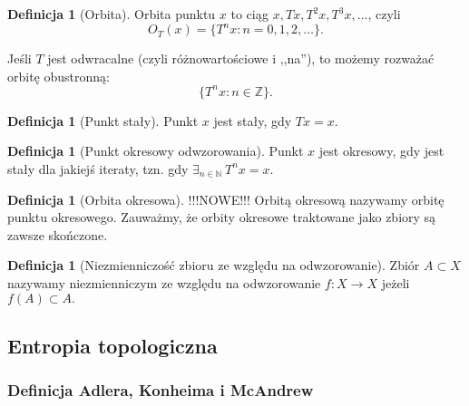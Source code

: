 \documentclass[licencjacka]{pwr_wmat_praca_dyplomowa}
\theoremstyle{plain}
\numberwithin{theorem}{chapter}
\theoremstyle{definition}
\numberwithin{theorem}{chapter}
\newtheorem{definition}[theorem]{Definicja}
\begin{document}
\begin{definition}[Orbita]
Orbita punktu $x$ to ciąg $x, Tx, T^2x, T^3x,\ldots$, czyli 
$$O_T(x) = \{T^nx: n=0,1,2,\ldots\}.$$

Jeśli $T$ jest odwracalne (czyli różnowartościowe i ,,na''), to możemy rozważać orbitę obustronną:
$$\{T^nx: n \in \mathbb{Z}\}.$$
\end{definition}

\begin{definition}[Punkt stały]
Punkt $x$ jest stały, gdy $Tx = x$.
\end{definition}

\begin{definition}[Punkt okresowy odwzorowania]
Punkt $x$ jest okresowy, gdy jest stały dla jakiejś iteraty, tzn. gdy $\exists_{n \in \mathbb{N}} \, T^nx = x$.
\end{definition}


\begin{definition}[Orbita okresowa]
{\color{red}!!!NOWE!!!
Orbitą okresową nazywamy orbitę punktu okresowego. Zauważmy, że orbity okresowe traktowane jako zbiory są zawsze skończone.
}
\end{definition}

\begin{definition}[Niezmienniczość zbioru ze względu na odwzorowanie]
Zbiór $A \subset X$ nazywamy niezmienniczym ze względu na odwzorowanie $f: X \rightarrow X$ jeżeli $f(A) \subset A.$
\end{definition}



\subsection{Entropia topologiczna}

\subsubsection{Definicja Adlera, Konheima i McAndrew}
\end{document}
